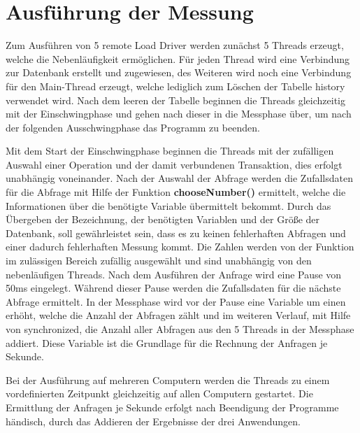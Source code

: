 \section{Ausführung der Messung}

Zum Ausführen von 5 remote Load Driver werden zunächst 5 Threads erzeugt, welche die Nebenläufigkeit 
ermöglichen. Für jeden Thread wird eine Verbindung zur Datenbank erstellt und zugewiesen, des 
Weiteren wird noch eine Verbindung für den Main-Thread erzeugt, welche lediglich zum Löschen der 
Tabelle history verwendet wird. Nach dem leeren der Tabelle beginnen die Threads gleichzeitig mit 
der Einschwingphase und gehen nach dieser in die Messphase über, um nach der folgenden 
Ausschwingphase das Programm zu beenden.

Mit dem Start der Einschwingphase beginnen die Threads mit der zufälligen Auswahl einer Operation 
und der damit verbundenen Transaktion, dies erfolgt unabhängig voneinander. Nach der Auswahl der 
Abfrage werden die Zufallsdaten für die Abfrage mit Hilfe der Funktion
\textbf{chooseNumber()} ermittelt, welche die Informationen über die benötigte
Variable übermittelt bekommt. Durch das Übergeben der Bezeichnung, der
benötigten Variablen und der Größe der Datenbank, soll gewährleistet sein, dass es zu keinen fehlerhaften Abfragen und einer dadurch fehlerhaften Messung kommt. Die Zahlen werden von 
der Funktion im zulässigen Bereich zufällig ausgewählt und sind unabhängig von den nebenläufigen 
Threads. Nach dem Ausführen der Anfrage wird eine Pause von 50ms eingelegt.
Während dieser Pause werden die Zufallsdaten für die nächste Abfrage ermittelt.
In der Messphase wird vor der Pause eine Variable um einen erhöht, welche die Anzahl der Abfragen zählt und im weiteren Verlauf, mit Hilfe 
von synchronized, die Anzahl aller Abfragen aus den 5 Threads in der Messphase addiert. Diese 
Variable ist die Grundlage für die Rechnung der Anfragen je Sekunde.

Bei der Ausführung auf mehreren Computern werden die Threads zu einem vordefinierten Zeitpunkt 
gleichzeitig auf allen Computern gestartet. Die Ermittlung der Anfragen je Sekunde erfolgt nach 
Beendigung der Programme händisch, durch das Addieren der Ergebnisse der drei Anwendungen.


\clearpage